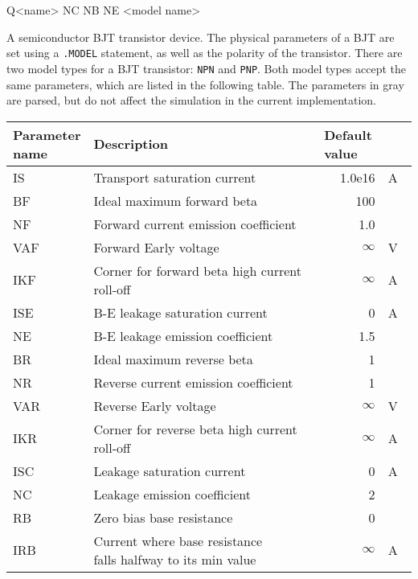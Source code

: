 \begin{code}
Q<name> NC NB NE <model name>
\end{code}

A semiconductor BJT transistor device. The physical parameters of a BJT are set using a \texttt{.MODEL} statement, as well as the polarity of the transistor. There are two model types for a BJT transistor: \texttt{NPN} and \texttt{PNP}. Both model types accept the same parameters, which are listed in the following table. The parameters in gray are parsed, but do not affect the simulation in the current implementation.

\begin{center}
	\begin{longtable}{|l|l|r l|}
		\hline
		\makecell[l]{Parameter \\ name} & Description & \multicolumn{2}{l|}{Default value} \\ 
		\hline \hline
		IS 	&	Transport saturation current	&	1.0e16 &	A 	 \\ \hline
BF 	&	Ideal maximum forward beta	&	100 &	 	 \\ \hline
NF 	&	Forward current emission coefficient	&	1.0 	   &	 	 \\ \hline
VAF 	&	Forward Early voltage	&	$ \infty{}$    &	V 	 \\ \hline
IKF 	&	Corner for forward beta high current roll-off	&	$ \infty{}$    &	A 	 \\ \hline
ISE 	&	B-E leakage saturation current	&	0 	&   	A 	 \\ \hline
NE 	&	B-E leakage emission coefficient	&	1.5 	&   	 	 \\ \hline
BR 	&	Ideal maximum reverse beta 	&	1 	&   	 	 \\ \hline
NR 	&	Reverse current emission coefficient	&	1 	&   	 	 \\ \hline
VAR 	&	Reverse Early voltage	&	$ \infty{}$    &	V 	 \\ \hline
IKR 	&	Corner for reverse beta high current roll-off	&	$ \infty{}$    &	A 	 \\ \hline
ISC 	&	Leakage saturation current	&	0 	&   	A 	 \\ \hline
NC 	&	Leakage emission coefficient	&	2 	&   	 	 \\ \hline
	RB 	&		Zero bias base resistance	&		0 	&	   	 	 \\ \hline
\color{lightgray}	IRB 	&	\color{lightgray}	\makecell[l]{Current where base resistance \\ falls halfway to its min value}	&	\color{lightgray}	$ \infty{}$ &	\color{lightgray}	A 	 \\ \hline

\end{longtable}
\end{center}
